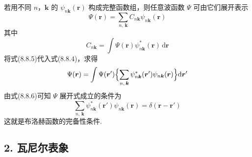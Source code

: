 若用不同 $n$，$\boldsymbol{k}$ 的 $\psi_{n\boldsymbol{k}}(\boldsymbol{r})$ 构成完整函数组，则任意波函数 $\Psi$ 可由它们展开表示
\begin{equation}
  \Psi(\boldsymbol{r})=\sum_{n,\,\boldsymbol{k}}C_{n\boldsymbol{k}}\psi_{n\boldsymbol{k}}(\boldsymbol{r})
\end{equation}
其中
\begin{equation}
  C_{n\boldsymbol{k}}=\int\Psi(\boldsymbol{r})\psi_{n\boldsymbol{k}}^{*}(\boldsymbol{r})\,\mathrm{d}\boldsymbol{r}
\end{equation}
将式(8.8.5)代入式(8.8.4)，求得
\begin{equation}
  \Psi(\boldsymbol{r})=\int\Psi(\boldsymbol{r}')\Bigl\{\sum_{n,\,\boldsymbol{k}}\psi_{n\boldsymbol{k}}^{*}(\boldsymbol{r}')\psi_{n\boldsymbol{k}}(\boldsymbol{r})\Bigr\}\mathrm{d}\boldsymbol{r}'
\end{equation}
由式(8.8.6)可知 $\Psi$ 展开式成立的条件为
\begin{equation}
  \sum_{n,\,\boldsymbol{k}}\psi_{n\boldsymbol{k}}^{*}(\boldsymbol{r}')\psi_{n\boldsymbol{k}}(\boldsymbol{r})=\delta(\boldsymbol{r}-\boldsymbol{r}')
\end{equation}
这就是布洛赫函数的完备性条件.

\subsection*{2. 瓦尼尔表象}

